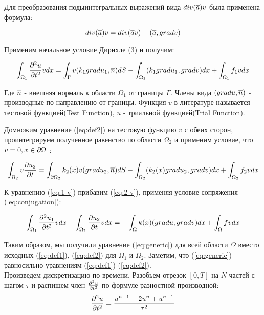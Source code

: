 Для преобразования подыинтегральных выражений вида $ div(\overline{a}) v$ была применена формула:

$$ div(\overline{a}) v = div(\overline{a} v) - (\overline{a}, gradv)$$

Применим начальное условие Дирихле (3) и получим:

\begin{equation}
    \int_{\Omega_1} {\frac{\partial^2 u}{\partial t^2}} v dx  = \int_\Gamma v(k_1 gradu_1, \overline{n}) dS - \int_{\Omega_1}(k_1 gradu_1, gradv)dx + \int_{\Omega_1} f_1vdx 
    \label{eq:1-v}
\end{equation}


Где $\overline{n}$ - внешняя нормаль к области $\Omega_1$ от границы $\Gamma$.
Члены вида $(grad u, \overline{n})$ - производные по направлению от границы. 
Функция $v$ в литературе называется тестовой функцией(Test Function), $u$ - триальной функцией(Trial Function)\cite{bib:logg}.

Домножим уравнение (\ref{eq:def2}) на тестовую функцию $v$ с обеих сторон, проинтегрируем полученное равенство по области $\Omega_2$ и применим условие, что $v = 0, x \in {\partial \Omega}$ :

\begin{equation}
    \int_{\Omega_2} v{\frac{\partial u_2}{\partial t}} = \int_{{\partial \Omega}_2} k_2(x)v(grad u_2, \overline{n})dS - \int_{\Omega_2}(k_2(x) gradu_2, grad v) dx + \int_{\Omega_2} f_2vdx
    \label{eq:2-v}
\end{equation}


К уравнению (\ref{eq:1-v}) прибавим (\ref{eq:2-v}), применяя условие сопряжения (\ref{eq:conjugation}):

\begin{equation}
    \int_{\Omega_1} {\frac{\partial^2 u_1}{\partial t^2}} v dx + \int_{\Omega_2}{\frac{\partial u_2}{\partial t}}vdx  = -\int_{\Omega} k(x)(gradu, gradv)dx + \int_{\Omega} fv dx
    \label{eq:generic}
\end{equation}


Таким образом, мы получили уравнение (\ref{eq:generic}) для всей области $\Omega$ вместо
исходных (\ref{eq:def1}), (\ref{eq:def2}) для $\Omega_1$ и $\Omega_2$. Заметим, что (\ref{eq:generic}) равносильно уравнениям (\ref{eq:def1})-(\ref{eq:def2}).\\

Произведем дискретизацию по времени. Разобьем отрезок $[0, T]$ на $N$ частей с шагом $\tau$
и распишем член ${\frac{\partial^2 u}{\partial t^2}}$  по формуле разностной производной:
\begin{equation}
     {\frac{\partial^2 u}{\partial t^2}} = \frac{u^{n+1} - 2 u^n + u^{n-1}}{\tau^2} 
     \label{eq:pdtt-discr}
\end{equation}

